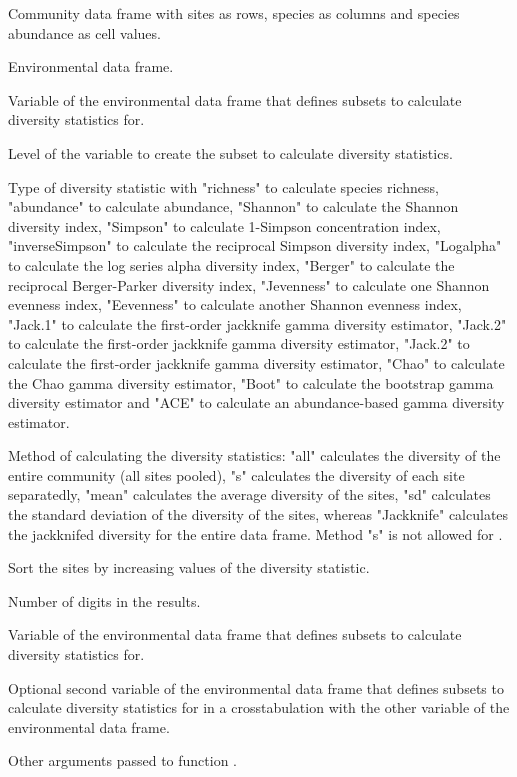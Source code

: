 \begin{Arguments}
\begin{ldescription}
\item[\code{x}] Community data frame with sites as rows, species as columns and species abundance as cell values. 
\item[\code{y}] Environmental data frame. 
\item[\code{factor}] Variable of the environmental data frame that defines subsets to calculate diversity statistics for. 
\item[\code{level}] Level of the variable to create the subset to calculate diversity statistics. 
\item[\code{index}] Type of diversity statistic with "richness" to calculate species richness, "abundance" to calculate abundance, "Shannon" to calculate the Shannon diversity index, "Simpson" to calculate 1-Simpson concentration index, "inverseSimpson" to calculate the reciprocal Simpson diversity index, "Logalpha" to calculate the log series alpha diversity index, "Berger" to calculate the reciprocal Berger-Parker diversity index, "Jevenness" to calculate one Shannon evenness index, "Eevenness" to calculate another Shannon evenness index, "Jack.1" to calculate the first-order jackknife gamma diversity estimator, "Jack.2" to calculate the first-order jackknife gamma diversity estimator, "Jack.2" to calculate the first-order jackknife gamma diversity estimator, "Chao" to calculate the Chao gamma diversity estimator, "Boot" to calculate the bootstrap gamma diversity estimator and "ACE" to calculate an abundance-based gamma diversity estimator. 
\item[\code{method}] Method of calculating the diversity statistics: "all" calculates the diversity of the entire community (all sites pooled), "s" calculates the diversity of each site separatedly, "mean" calculates the average diversity of the sites, "sd" calculates the standard deviation of the diversity of the sites, whereas "Jackknife" calculates the jackknifed diversity for the entire data frame. Method "s" is not allowed for .  
\item[\code{sortit}] Sort the sites by increasing values of the diversity statistic. 
\item[\code{digits}] Number of digits in the results. 
\item[\code{factor1}] Variable of the environmental data frame that defines subsets to calculate diversity statistics for. 
\item[\code{factor2}] Optional second variable of the environmental data frame that defines subsets to calculate diversity statistics for in a crosstabulation with the other variable of the environmental data frame. 
\item[\code{...}] Other arguments passed to function . 
\end{ldescription}
\end{Arguments}
